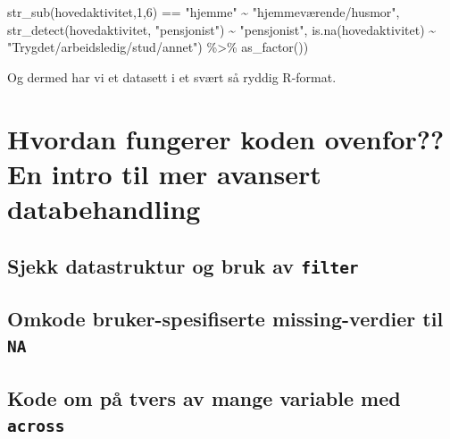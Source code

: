 \documentclass[
  letterpaper,
  DIV=11,
  numbers=noendperiod]{scrreprt}
\newenvironment{Shaded}{\begin{snugshade}}{\end{snugshade}}
\newcommand{\DecValTok}[1]{\textcolor[rgb]{0.68,0.00,0.00}{#1}}
\newcommand{\FunctionTok}[1]{\textcolor[rgb]{0.28,0.35,0.67}{#1}}
\newcommand{\NormalTok}[1]{\textcolor[rgb]{0.00,0.23,0.31}{#1}}
\newcommand{\SpecialCharTok}[1]{\textcolor[rgb]{0.37,0.37,0.37}{#1}}
\newcommand{\StringTok}[1]{\textcolor[rgb]{0.13,0.47,0.30}{#1}}
\theoremstyle{definition}
\theoremstyle{remark}
\begin{document}
\begin{Shaded}
\begin{Highlighting}[]
                                      \FunctionTok{str\_sub}\NormalTok{(hovedaktivitet,}\DecValTok{1}\NormalTok{,}\DecValTok{6}\NormalTok{)   }\SpecialCharTok{==} \StringTok{"hjemme"} \SpecialCharTok{\textasciitilde{}} \StringTok{"hjemmeværende/husmor"}\NormalTok{, }
                                      \FunctionTok{str\_detect}\NormalTok{(hovedaktivitet, }\StringTok{"pensjonist"}\NormalTok{) }\SpecialCharTok{\textasciitilde{}} \StringTok{"pensjonist"}\NormalTok{, }
                                      \FunctionTok{is.na}\NormalTok{(hovedaktivitet) }\SpecialCharTok{\textasciitilde{}} \StringTok{"Trygdet/arbeidsledig/stud/annet"}\NormalTok{) }\SpecialCharTok{\%\textgreater{}\%} \FunctionTok{as\_factor}\NormalTok{())}
\end{Highlighting}
\end{Shaded}

Og dermed har vi et datasett i et svært så ryddig R-format.

\hypertarget{hvordan-fungerer-koden-ovenfor-en-intro-til-mer-avansert-databehandling}{%
\section{Hvordan fungerer koden ovenfor?? En intro til mer avansert
databehandling}\label{hvordan-fungerer-koden-ovenfor-en-intro-til-mer-avansert-databehandling}}

\hypertarget{sjekk-datastruktur-og-bruk-av-filter}{%
\subsection{\texorpdfstring{Sjekk datastruktur og bruk av
\texttt{filter}}{Sjekk datastruktur og bruk av filter}}\label{sjekk-datastruktur-og-bruk-av-filter}}

\hypertarget{omkode-bruker-spesifiserte-missing-verdier-til-na}{%
\subsection{\texorpdfstring{Omkode bruker-spesifiserte missing-verdier
til
\texttt{NA}}{Omkode bruker-spesifiserte missing-verdier til NA}}\label{omkode-bruker-spesifiserte-missing-verdier-til-na}}

\hypertarget{kode-om-puxe5-tvers-av-mange-variable-med-across}{%
\subsection{\texorpdfstring{Kode om på tvers av mange variable med
\texttt{across}}{Kode om på tvers av mange variable med across}}\label{kode-om-puxe5-tvers-av-mange-variable-med-across}}
\end{document}
